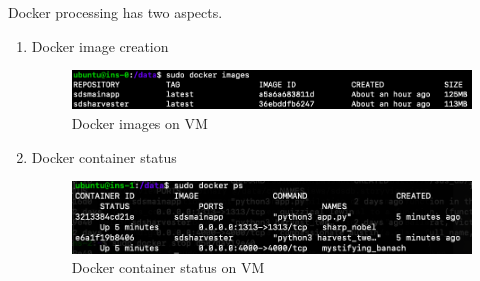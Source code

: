Docker processing has two aspects. 
\begin{enumerate}
    \item Docker image creation
    
    \begin{figure}[ht]
        \centering
        \includegraphics[width=12cm,keepaspectratio=true]{images/deployment/docker_images.png}
        \caption{Docker images on VM}
        \label{fig:docker_images}
    \end{figure}
    
    \item Docker container status
    \begin{figure}[ht]
        \centering
        \includegraphics[width=12cm,keepaspectratio=true]{images/deployment/docker_ps.png}
        \caption{Docker container status on VM}
        \label{fig:docker_container}
    \end{figure}
\end{enumerate}